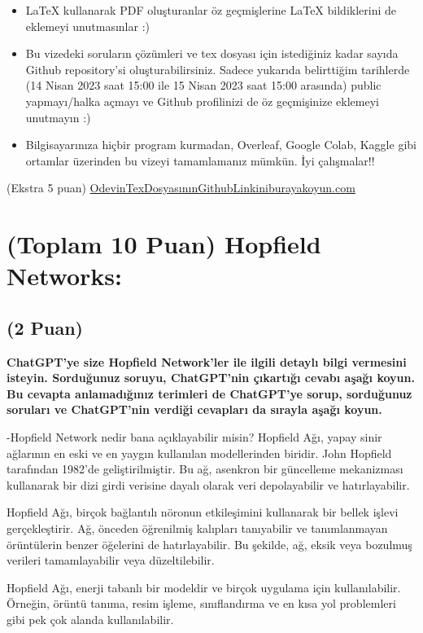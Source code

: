 \documentclass[11pt]{article}
\begin{document}
\begin{itemize}
    \item LaTeX kullanarak PDF oluşturanlar öz geçmişlerine LaTeX bildiklerini de eklemeyi unutmasınlar :)
    \item Bu vizedeki soruların çözümleri ve tex dosyası için istediğiniz kadar sayıda Github repository'si oluşturabilirsiniz. Sadece yukarıda belirttiğim tarihlerde (14 Nisan 2023 saat 15:00 ile 15 Nisan 2023 saat 15:00 arasında) public yapmayı/halka açmayı ve Github profilinizi de öz geçmişinize eklemeyi unutmayın :)
    \item Bilgisayarınıza hiçbir program kurmadan, Overleaf, Google Colab, Kaggle gibi ortamlar üzerinden bu vizeyi tamamlamanız mümkün. İyi çalışmalar!!
\end{itemize}

(Ekstra 5 puan) \url{OdevinTexDosyasınınGithubLinkiniburayakoyun.com}

\newpage
\section{(Toplam 10 Puan) Hopfield Networks:}

\subsection{(2 Puan)} \textbf{ChatGPT’ye size Hopfield Network’ler ile ilgili detaylı bilgi vermesini isteyin. Sorduğunuz soruyu, ChatGPT'nin çıkartığı cevabı aşağı koyun. Bu cevapta anlamadığınız terimleri de ChatGPT’ye sorup, sorduğunuz soruları ve ChatGPT’nin verdiği cevapları da sırayla aşağı koyun.}

-Hopfield Network nedir bana açıklayabilir misin?
Hopfield Ağı, yapay sinir ağlarının en eski ve en yaygın kullanılan modellerinden biridir. John Hopfield tarafından 1982'de geliştirilmiştir. Bu ağ, asenkron bir güncelleme mekanizması kullanarak bir dizi girdi verisine dayalı olarak veri depolayabilir ve hatırlayabilir.

Hopfield Ağı, birçok bağlantılı nöronun etkileşimini kullanarak bir bellek işlevi gerçekleştirir. Ağ, önceden öğrenilmiş kalıpları tanıyabilir ve tanımlanmayan örüntülerin benzer öğelerini de hatırlayabilir. Bu şekilde, ağ, eksik veya bozulmuş verileri tamamlayabilir veya düzeltilebilir.

Hopfield Ağı, enerji tabanlı bir modeldir ve birçok uygulama için kullanılabilir. Örneğin, örüntü tanıma, resim işleme, sınıflandırma ve en kısa yol problemleri gibi pek çok alanda kullanılabilir.
\end{document}
